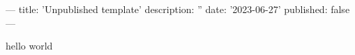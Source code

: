 ---
title: 'Unpublished template'
description: ''
date: '2023-06-27'
published: false
---

hello world
